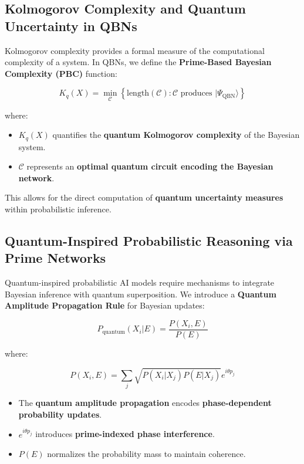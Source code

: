 \documentclass{article}
\theoremstyle{plain}
\theoremstyle{plain}
\theoremstyle{definition}
\theoremstyle{remark}
\begin{document}
\subsection{Kolmogorov Complexity and Quantum Uncertainty in QBNs}

Kolmogorov complexity provides a formal measure of the computational complexity of a system. In QBNs, we define the \textbf{Prime-Based Bayesian Complexity (PBC)} function:

\begin{equation}
K_q (X) = \min_{\mathcal{C}} \left\{ \text{length}(\mathcal{C}) : \mathcal{C} \text{ produces } |\Psi_{\text{QBN}} \rangle \right\}
\end{equation}

where:
\begin{itemize}
    \item $K_q (X)$ quantifies the \textbf{quantum Kolmogorov complexity} of the Bayesian system.
    \item $\mathcal{C}$ represents an \textbf{optimal quantum circuit encoding the Bayesian network}.
\end{itemize}

This allows for the direct computation of \textbf{quantum uncertainty measures} within probabilistic inference.

\subsection{Quantum-Inspired Probabilistic Reasoning via Prime Networks}

Quantum-inspired probabilistic AI models require mechanisms to integrate Bayesian inference with quantum superposition. We introduce a \textbf{Quantum Amplitude Propagation Rule} for Bayesian updates:

\begin{equation}
P_{\text{quantum}} (X_i | E) = \frac{P(X_i, E)}{P(E)}
\end{equation}

where:

\begin{equation}
P(X_i, E) = \sum_{j} \sqrt{P(X_i | X_j) P(E | X_j)} e^{i\theta p_j}
\end{equation}

\begin{itemize}
    \item The \textbf{quantum amplitude propagation} encodes \textbf{phase-dependent probability updates}.
    \item $e^{i\theta p_j}$ introduces \textbf{prime-indexed phase interference}.
    \item $P(E)$ normalizes the probability mass to maintain coherence.
\end{itemize}
\end{document}
